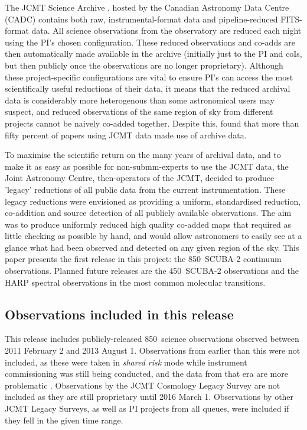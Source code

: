 \documentclass[usenatbib]{mn2e}
\newcommand{\um}{\micron}
\begin{document}
The JCMT Science Archive \citep{2015Economou}, hosted by the Canadian
Astronomy Data Centre (CADC) contains both raw, instrumental-format
data and pipeline-reduced FITS-format data. All science observations
from the observatory are reduced each night using the PI's chosen
configuration.  These reduced observations and co-adds are then
automatically made available in the archive (initially just to the PI
and coIs, but then publicly once the observations are no longer
proprietary). Although these project-specific configurations are vital
to ensure PI's can access the most scientifically useful reductions of
their data, it means that the reduced archival data is considerably
more heterogenous than some astronomical users may suspect, and
reduced observations of the same region of sky from different projects
cannot be naively co-added together. Despite this,
\citet{Bell2014} found that more than fifty percent of
papers using JCMT data made use of archive data.

To maximise the scientific return on the many years of archival data,
and to make it as easy as possible for non-submm-experts to use the
JCMT data, the Joint Astronomy Centre, then-operators of the JCMT,
decided to produce 'legacy' reductions of all public data from the
current instrumentation. These legacy reductions were envisioned as
providing a uniform, standardised reduction, co-addition and source
detection of all publicly available observations. The aim was to
produce uniformly reduced high quality co-added maps that required as
little checking as possible by hand, and would allow astronomers to
easily see at a glance what had been observed and detected on any
given region of the sky. This paper presents the first release in this
project: the 850\um\ SCUBA-2 continuum observations. Planned future
releases are the 450\um\ SCUBA-2 observations and the HARP spectral
observations in the most common molecular transitions.



\subsection{Observations included in this release}

This release includes publicly-released 850\um\ science observations
observed between 2011 February 2 and 2013 August 1. Observations from
earlier than this were not included, as these were taken in
\emph{shared risk} mode while instrument commissioning was still being
conducted, and the data from that era are more problematic
\citep{SC19,Dempsey2010}.  Observations by the JCMT Cosmology Legacy
Survey \citep{Geach2013} are not included as they are still
proprietary until 2016 March 1. Observations by other JCMT Legacy
Surveys, as well as PI projects from all queues, were included if they
fell in the given time range.
\end{document}
